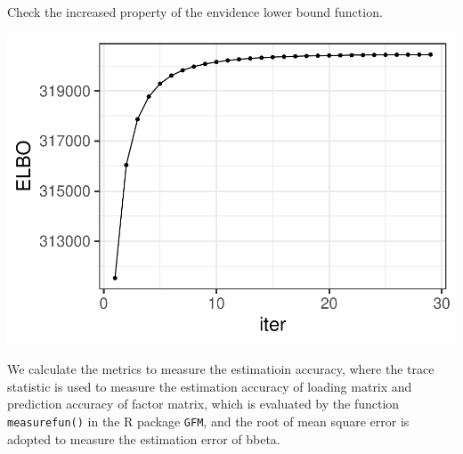 \documentclass[
]{article}
\newenvironment{Shaded}{\begin{snugshade}}{\end{snugshade}}
\newcommand{\DataTypeTok}[1]{\textcolor[rgb]{0.13,0.29,0.53}{#1}}
\newcommand{\DecValTok}[1]{\textcolor[rgb]{0.00,0.00,0.81}{#1}}
\newcommand{\KeywordTok}[1]{\textcolor[rgb]{0.13,0.29,0.53}{\textbf{#1}}}
\newcommand{\NormalTok}[1]{#1}
\newcommand{\OperatorTok}[1]{\textcolor[rgb]{0.81,0.36,0.00}{\textbf{#1}}}
\newcommand{\StringTok}[1]{\textcolor[rgb]{0.31,0.60,0.02}{#1}}
\begin{document}
Check the increased property of the envidence lower bound function.

\begin{Shaded}
\end{Shaded}

\includegraphics{COAPsimu_files/figure-latex/unnamed-chunk-5-1.pdf}

We calculate the metrics to measure the estimatioin accuracy, where the
trace statistic is used to measure the estimation accuracy of loading
matrix and prediction accuracy of factor matrix, which is evaluated by
the function \texttt{measurefun()} in the R package \texttt{GFM}, and
the root of mean square error is adopted to measure the estimation error
of bbeta.
\end{document}
